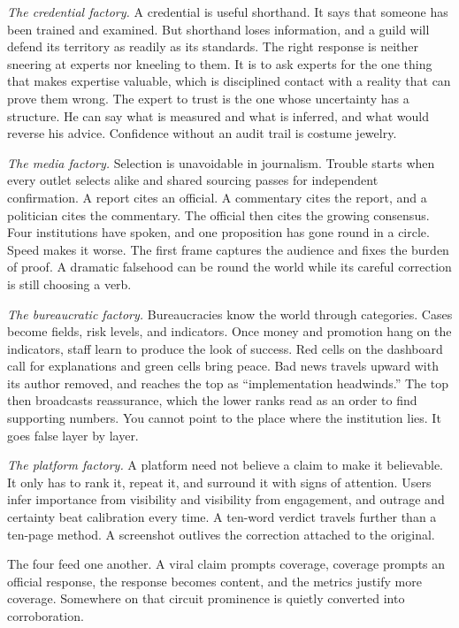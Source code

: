 \documentclass[12pt,a4paper]{book}
\begin{document}
\emph{The credential factory.} A credential is useful shorthand. It says that someone has been trained and examined. But shorthand loses information, and a guild will defend its territory as readily as its standards. The right response is neither sneering at experts nor kneeling to them. It is to ask experts for the one thing that makes expertise valuable, which is disciplined contact with a reality that can prove them wrong. The expert to trust is the one whose uncertainty has a structure. He can say what is measured and what is inferred, and what would reverse his advice. Confidence without an audit trail is costume jewelry.

\emph{The media factory.} Selection is unavoidable in journalism. Trouble starts when every outlet selects alike and shared sourcing passes for independent confirmation. A report cites an official. A commentary cites the report, and a politician cites the commentary. The official then cites the growing consensus. Four institutions have spoken, and one proposition has gone round in a circle. Speed makes it worse. The first frame captures the audience and fixes the burden of proof. A dramatic falsehood can be round the world while its careful correction is still choosing a verb.

\emph{The bureaucratic factory.} Bureaucracies know the world through categories. Cases become fields, risk levels, and indicators. Once money and promotion hang on the indicators, staff learn to produce the look of success. Red cells on the dashboard call for explanations and green cells bring peace. Bad news travels upward with its author removed, and reaches the top as ``implementation headwinds.'' The top then broadcasts reassurance, which the lower ranks read as an order to find supporting numbers. You cannot point to the place where the institution lies. It goes false layer by layer.

\emph{The platform factory.} A platform need not believe a claim to make it believable. It only has to rank it, repeat it, and surround it with signs of attention. Users infer importance from visibility and visibility from engagement, and outrage and certainty beat calibration every time. A ten-word verdict travels further than a ten-page method. A screenshot outlives the correction attached to the original.

The four feed one another. A viral claim prompts coverage, coverage prompts an official response, the response becomes content, and the metrics justify more coverage. Somewhere on that circuit prominence is quietly converted into corroboration.
\end{document}
